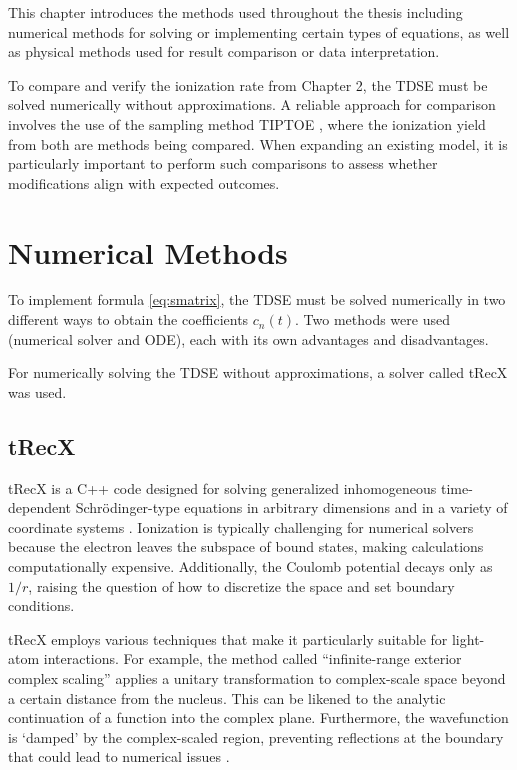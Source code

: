 This chapter introduces the methods used throughout the thesis including numerical methods for solving or implementing certain types of equations, as well as physical methods used for result comparison or data interpretation.


To compare and verify the ionization rate from Chapter 2, the TDSE must be solved numerically without approximations.
A reliable approach for comparison involves the use of the sampling method TIPTOE \cite{Park:18}, where the ionization yield from both are methods being compared.
When expanding an existing model, it is particularly important to perform such comparisons to assess whether modifications align with expected outcomes.

\section{Numerical Methods}
To implement formula \ref{eq:smatrix}, the TDSE must be solved numerically in two different ways to obtain the coefficients $c_n(t)$.  
Two methods were used (numerical solver and ODE), each with its own advantages and disadvantages.  

For numerically solving the TDSE without approximations, a solver called tRecX was used.  


\subsection{tRecX}
tRecX is a C++ code designed for solving generalized inhomogeneous time-dependent Schrödinger-type equations in arbitrary dimensions and in a variety of coordinate systems \cite{Scrinzi_trecx}.
Ionization is typically challenging for numerical solvers because the electron leaves the subspace of bound states, making calculations computationally expensive.
Additionally, the Coulomb potential decays only as $1/r$, raising the question of how to discretize the space and set boundary conditions.

tRecX employs various techniques that make it particularly suitable for light-atom interactions.
For example, the method called ``infinite-range exterior complex scaling'' applies a unitary transformation to complex-scale space beyond a certain distance from the nucleus.
This can be likened to the analytic continuation of a function into the complex plane.
Furthermore, the wavefunction is `damped' by the complex-scaled region, preventing reflections at the boundary that could lead to numerical issues \cite{scrinzi_irecs}.

